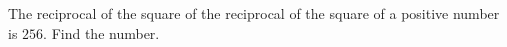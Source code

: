 The reciprocal of the square of the reciprocal of the square of a positive number is $256$. Find the number.
